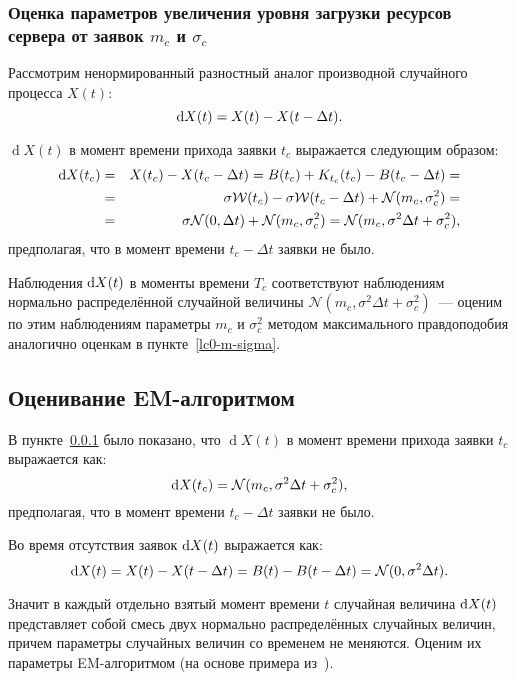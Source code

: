 \documentclass[a4paper,10pt]{article}
\begin{document}
\subsubsection{Оценка параметров увеличения уровня загрузки ресурсов сервера %
от заявок $m_c$ и $\sigma_c$}%
\label{lc0-mc-sigmac}
Рассмотрим ненормированный разностный аналог производной 
случайного процесса $X(t)$:
$$\dif X(t) = X(t) - X(t - \Delta t).$$

$\operatorname{d}X(t)$ в момент времени прихода заявки $t_c$ 
выражается следующим образом:
\begin{eqnarray*}
\dif X(t_c) 
  & = & X(t_c) - X(t_c - \Delta t) = 
      B(t_c) + K_{t_c}(t_c) - B(t_c - \Delta t) = \\
  & = & \sigma \mathcal{W}(t_c) - \sigma \mathcal{W}(t_c - \Delta t) + 
      \mathcal{N}(m_c, \sigma_c^2) = \\
  & = & \sigma \mathcal{N}(0, \Delta t) + \mathcal{N}(m_c, \sigma_c^2) =
      \mathcal{N}(m_c, \sigma^2 \Delta t + \sigma_c^2),
\end{eqnarray*}
предполагая, что в момент времени $t_c - \Delta t$ заявки не было.

Наблюдения $\dif X(t)$ в моменты времени $T_c$ соответствуют наблюдениям 
нормально распределённой случайной величины 
$\mathcal{N}(m_c, \sigma^2 \Delta t + \sigma_c^2)$~--- 
оценим по этим наблюдениям параметры $m_c$ и $\sigma_c^2$ 
методом максимального правдоподобия аналогично оценкам в 
пункте~\ref{lc0-m-sigma}.

\subsection{Оценивание EM-алгоритмом}%
\label{EM}
В пункте~\ref{lc0-mc-sigmac} было показано, 
что $\operatorname{d}X(t)$ в момент времени прихода заявки $t_c$ 
выражается как:
$$
  \dif X(t_c) = \mathcal{N}(m_c, \sigma^2 \Delta t + \sigma_c^2),
$$
предполагая, что в момент времени $t_c - \Delta t$ заявки не было.

Во время отсутствия заявок $\dif X(t)$ выражается как:
$$
\dif X(t) = X(t) - X(t - \Delta t) = 
    B(t) - B(t - \Delta t) =
    \mathcal{N}(0, \sigma^2 \Delta t).
$$

Значит в каждый отдельно взятый момент времени $t$ 
случайная величина $\dif X(t)$ представляет собой смесь двух нормально 
распределённых случайных величин, 
причем параметры случайных величин со временем не меняются.
Оценим их параметры EM-алгоритмом 
(на основе примера из~\cite{wiki:em-algorithm}).
\end{document}
